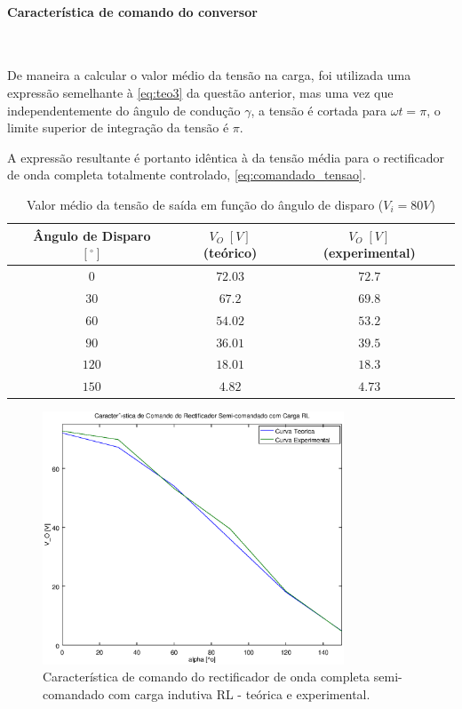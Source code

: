 \documentclass[a4paper,11pt]{article}
\numberwithin{equation}{section}
\begin{document}
\paragraph{Característica de comando do conversor} \mbox{}\


De maneira a calcular o valor médio da tensão na carga, foi utilizada uma expressão semelhante à \autoref{eq:teo3} da questão anterior, mas uma vez que independentemente do ângulo de condução $\gamma$, a tensão é cortada para $\omega t = \pi$, o limite superior de integração da tensão é $\pi$.

A expressão resultante é portanto idêntica à da tensão média para o rectificador de onda completa totalmente controlado, \autoref{eq:comandado_tensao}.

\begin{table}[H]
\centering
\begin{tabular}{c c c c c c c}
\hfil & Ângulo de Disparo $[^\circ]$ & \hfil & $V_O\;[V]$ (teórico) & \hfil & $V_O\;[V]$ (experimental) & \hfil \\
\hline
			&$0$&	&$72.03$&		&$72.7$&\\
\rowcolor{SkyBlue}	&$30$&	&$67.2$&		&$69.8$&\\
			&$60$&	&$54.02$&		&$53.2$&\\
\rowcolor{SkyBlue}	&$90$&	&$36.01$&		&$39.5$&\\
			&$120$&	&$18.01$&		&$18.3$&\\
\rowcolor{SkyBlue}	&$150$&	&$4.82$&		&$4.73$&\\
\hline
\end{tabular}
\caption{Valor médio da tensão de saída em função do ângulo de disparo ($V_i = 80 V$)}
\label{tab:akpksemi}
\end{table}


\begin{figure}[H]
	\centering
	\includegraphics[keepaspectratio=true, width=0.8\textwidth]{img/comando3}
	\caption{Característica de comando do rectificador de onda completa semi-comandado com carga indutiva RL - teórica e experimental.}
	\label{fig:comando3}
	\vspace{-0.8em}
\end{figure}
\end{document}
